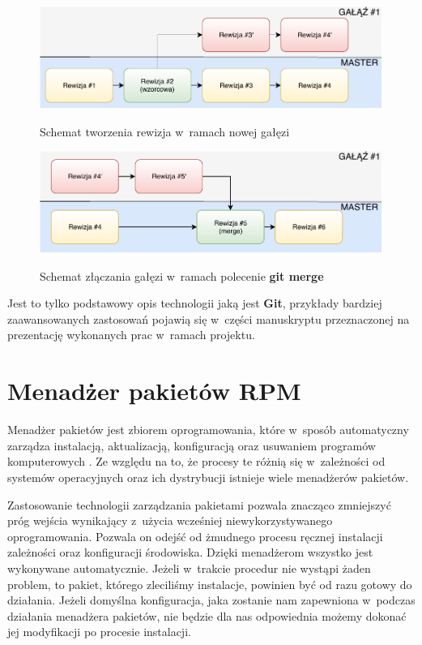 \begin{figure} [H]
\centering
\caption{Schemat tworzenia rewizja w~ramach nowej gałęzi}
\includegraphics[width=\textwidth]{res/branch}
\label{fig:branch}
\end{figure}

\begin{figure} [H]
\centering
\caption{Schemat złączania gałęzi w~ramach polecenie \textbf{git merge}}
\includegraphics[width=\textwidth]{res/branchMerge}
\label{fig:branch2}
\end{figure}

Jest to tylko podstawowy opis technologii jaką jest \textbf{Git}, przykłady bardziej zaawansowanych zastosowań pojawią się w~części manuskryptu przeznaczonej na prezentację wykonanych prac w~ramach projektu.


\section{Menadżer pakietów RPM}
Menadżer pakietów jest zbiorem oprogramowania, które w~sposób automatyczny zarządza instalacją, aktualizacją, konfiguracją oraz usuwaniem programów komputerowych \cite{ManagerWiki}. Ze względu na to, że procesy te różnią się w~zależności od systemów operacyjnych oraz ich dystrybucji istnieje wiele menadżerów pakietów.\par

Zastosowanie technologii zarządzania pakietami pozwala znacząco zmniejszyć próg wejścia wynikający z~użycia wcześniej niewykorzystywanego oprogramowania. Pozwala on odejść od żmudnego procesu ręcznej instalacji zależności oraz konfiguracji środowiska. Dzięki menadżerom wszystko jest wykonywane automatycznie. Jeżeli w~trakcie procedur nie wystąpi żaden problem, to pakiet, którego zleciliśmy instalacje, powinien być od razu gotowy do działania. Jeżeli domyślna konfiguracja, jaka zostanie nam zapewniona w~podczas działania menadżera pakietów, nie będzie dla nas odpowiednia możemy dokonać jej modyfikacji po procesie instalacji.

